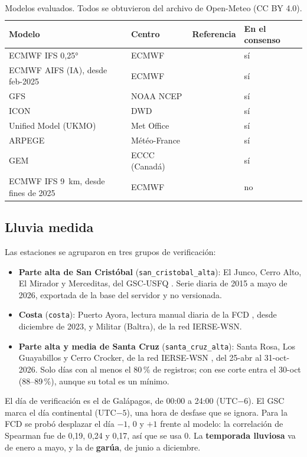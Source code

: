 \documentclass{sosg-informe}
\begin{document}
\begin{table}[ht]
  \centering\small
  \caption{Modelos evaluados. Todos se obtuvieron del archivo de Open-Meteo (CC BY 4.0).}
  \label{tab:modelos}
  \begin{tabular}{llll}
    \toprule
    Modelo & Centro & Referencia & En el consenso \\
    \midrule
    ECMWF IFS 0,25° & ECMWF & \citet{ecmwf_ifs} & sí \\
    ECMWF AIFS (IA), desde feb-2025 & ECMWF & \citet{lang2024} & sí \\
    GFS & NOAA NCEP & \citet{ncep_gfs} & sí \\
    ICON & DWD & \citet{zangl2015} & sí \\
    Unified Model (UKMO) & Met Office & \citet{walters2019} & sí \\
    ARPEGE & Météo-France & \citet{courtier1991} & sí \\
    GEM & ECCC (Canadá) & \citet{cote1998} & sí \\
    ECMWF IFS 9~km, desde fines de 2025 & ECMWF & \citet{ecmwf_ifs} & no \\
    \bottomrule
  \end{tabular}
\end{table}

\subsection{Lluvia medida}
Las estaciones se agruparon en tres grupos de verificación:
\begin{itemize}
  \item \textbf{Parte alta de San Cristóbal} (\texttt{san\_cristobal\_alta}): El Junco, Cerro Alto, El Mirador y Merceditas, del GSC-USFQ \citep{gsc2026}. Serie diaria de 2015 a mayo de 2026, exportada de la base del servidor y no versionada.
  \item \textbf{Costa} (\texttt{costa}): Puerto Ayora, lectura manual diaria de la FCD \citep{fcd2026}, desde diciembre de 2023, y Militar (Baltra), de la red IERSE-WSN.
  \item \textbf{Parte alta y media de Santa Cruz} (\texttt{santa\_cruz\_alta}): Santa Rosa, Los Guayabillos y Cerro Crocker, de la red IERSE-WSN \citep{ierse2023}, del 25-abr al 31-oct-2026. Solo días con al menos el 80\,\% de registros; con ese corte entra el 30-oct (88--89\,\%), aunque su total es un mínimo.
\end{itemize}

El día de verificación es el de Galápagos, de 00:00 a 24:00 (UTC$-6$). El GSC marca el día continental (UTC$-5$), una hora de desfase que se ignora. Para la FCD se probó desplazar el día $-1$, 0 y $+1$ frente al modelo: la correlación de Spearman fue de 0,19, 0,24 y 0,17, así que se usa 0. La \textbf{temporada lluviosa} va de enero a mayo, y la de \textbf{garúa}, de junio a diciembre.
\end{document}
